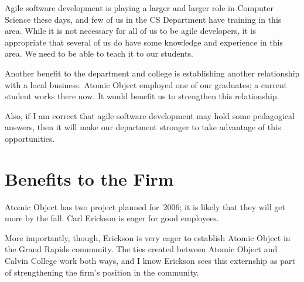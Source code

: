 \documentclass{article}
\begin{document}
Agile software development is playing a larger and larger role in Computer Science these days, and few of us in the CS Department have training in this area.  While it is not necessary for all of us to be agile developers, it is appropriate that several of us do have some knowledge and experience in this area.  We need to be able to teach it to our students.

Another benefit to the department and college is establishing another relationship with a local business.  Atomic Object employed one of our graduates; a current student works there now.  It would benefit us to strengthen this relationship.

Also, if I am correct that agile software development may hold some pedagogical answers, then it will make our department stronger to take advantage of this opportunities.

\section*{Benefits to the Firm}

Atomic Object has two project planned for~2006; it is likely that they will get more by the fall.  Carl Erickson is eager for good employees.

More importantly, though, Erickson is very eager to establish Atomic Object in the Grand Rapids community.  The ties created between Atomic Object and Calvin College work both ways, and I know Erickson sees this externship as part of strengthening the firm's position in the community.
\end{document}
